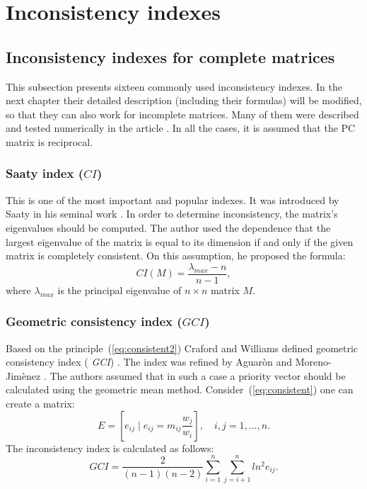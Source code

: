 \chapter{Inconsistency indexes}
\label{sec:inconsistencyIndexes}
\section{Inconsistency indexes for complete matrices}

This subsection presents sixteen commonly used inconsistency indexes. In the next chapter their detailed description (including their formulas) will be modified, so that they can also work for incomplete matrices. Many of them were described and tested numerically in the article \cite{Brunelli2013}. In all the cases, it is assumed that the PC matrix is reciprocal.


 \subsection{Saaty index ($\textit{CI}$)}

This is one of the most important and popular indexes. It was introduced by Saaty in his seminal work \cite{SAATY1977}. In order to determine inconsistency, the matrix's eigenvalues should be computed. The author used the dependence that the largest eigenvalue of the matrix is equal to its dimension if and only if the given matrix is completely consistent. On this assumption, he proposed the formula:
	\begin{equation} 
		CI(M)=\frac{\lambda_{max}-n}{n-1},
	 \end{equation}
 where $\lambda_{max}$
  is the principal eigenvalue of $n\times n$ matrix $M$.


\subsection{Geometric consistency index ($\textit{GCI}$)}

Based on the principle~(\ref{eq:consistent2}) Craford and Williams defined geometric consistency index (	\textit{GCI}) \cite{CRAWFORD1985}. The index was refined by Aguaròn and Moreno-Jimènez \cite{AGUARON2003}. The authors assumed that in such a case a priority vector should be calculated using the geometric mean method. Consider~(\ref{eq:consistent}) one can create a matrix:
	\begin{equation} 
		E=\left[e_{ij}\mid e_{ij}=m_{ij}\frac{w_{j}}{w_{i}}\right],\,\,\,\,\,\,i,j=1,...,n.
	 \end{equation}
 The inconsistency index is calculated as follows:
	 \begin{equation} 
		\label{eq:GCI}
		\textit{GCI}=\frac{2}{(n-1)(n-2)}\sum_{i=1}^{n}\sum_{j=i+1}^{n}ln^{2}e_{ij}.
	 \end{equation}

